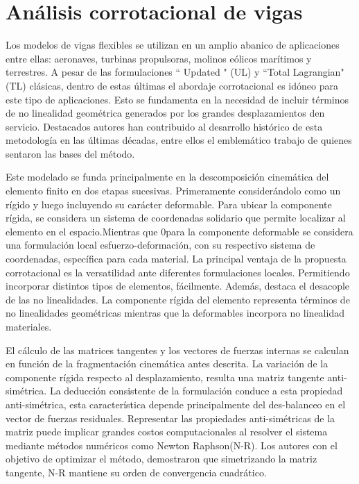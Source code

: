 \section{Análisis corrotacional de vigas}\label{Sec:EA:Corrotacional}
Los modelos de vigas flexibles se utilizan en un amplio abanico de aplicaciones entre ellas: aeronaves, turbinas propulsoras, molinos eólicos marítimos y terrestres. A pesar de las formulaciones `` Updated " (UL) y ``Total Lagrangian" (TL) clásicas,  dentro de estas últimas el abordaje corrotacional es idóneo para este tipo de aplicaciones. Esto se fundamenta en la necesidad de incluir términos de no linealidad geométrica generados por los grandes desplazamientos den servicio. Destacados autores han contribuido al desarrollo histórico de esta metodología en las últimas décadas, entre ellos el emblemático trabajo de \cite{Nour-Omid1991} quienes sentaron las bases del método. 

Este modelado se funda principalmente en la descomposición cinemática del elemento finito en dos etapas sucesivas. Primeramente considerándolo como un rígido y luego incluyendo su carácter deformable. Para ubicar la componente rígida, se considera un sistema de coordenadas solidario que permite localizar al elemento en el espacio.Mientras que 0para la componente deformable se considera una formulación local esfuerzo-deformación, con su respectivo sistema de coordenadas, específica para cada material. La principal ventaja de la propuesta corrotacional es la versatilidad ante diferentes formulaciones locales. Permitiendo incorporar distintos tipos de elementos, fácilmente. Además, destaca el desacople de las no linealidades. La componente rígida del elemento representa términos de no linealidades geométricas mientras que la deformables incorpora no linealidad materiales. 

El cálculo de las matrices tangentes y los vectores de fuerzas internas se calculan en función de la fragmentación cinemática antes descrita. La variación de la componente rígida respecto al desplazamiento, resulta una matriz tangente anti-simétrica. La deducción consistente de la formulación conduce a esta propiedad anti-simétrica, esta característica depende principalmente del des-balanceo en el vector de fuerzas residuales. Representar las propiedades anti-simétricas de la matriz puede implicar grandes costos computacionales al resolver el sistema mediante métodos numéricos como Newton Raphson(N-R). Los autores \cite{Nour-Omid1991} con el objetivo de optimizar el método, demostraron que simetrizando la matriz tangente, N-R mantiene su orden de convergencia cuadrático.

